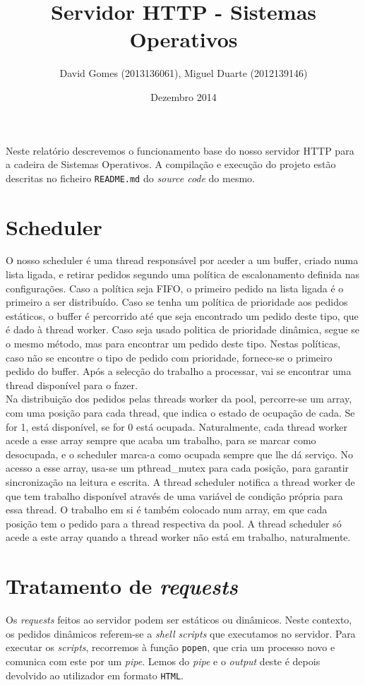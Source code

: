 \documentclass[12pt]{article}
\title{Servidor HTTP - Sistemas Operativos}
\author{David Gomes (2013136061), Miguel Duarte (2012139146)}
\date{Dezembro 2014}
\begin{document}
\maketitle

Neste relatório descrevemos o funcionamento base do nosso servidor HTTP
para a cadeira de Sistemas Operativos. A compilação e execução do projeto
estão descritas no ficheiro \texttt{README.md} do \textit{source code} do
mesmo.

\section{Scheduler}
O nosso scheduler é uma thread responsável por aceder a um buffer, criado numa lista ligada, e retirar pedidos segundo uma política de escalonamento definida nas configurações. Caso a política seja FIFO, o primeiro pedido na lista ligada é o primeiro a ser distribuído. Caso se tenha um política de prioridade aos pedidos estáticos, o buffer é percorrido até que seja encontrado um pedido deste tipo, que é dado à thread worker. Caso seja usado politica de prioridade dinâmica, segue se o mesmo método, mas para encontrar um pedido deste tipo. Nestas políticas, caso não se encontre o tipo de pedido com prioridade, fornece-se o primeiro pedido do buffer. Após a selecção do trabalho a processar, vai se encontrar uma thread disponível para o fazer.\\
Na distribuição dos pedidos pelas threads worker da pool, percorre-se um array, com uma posição para cada thread, que indica o estado de ocupação de cada. Se for 1, está disponível, se for 0 está ocupada. Naturalmente, cada thread worker acede a esse array sempre que acaba um trabalho, para se marcar como desocupada, e o scheduler marca-a como ocupada sempre que lhe dá serviço. No acesso a esse array, usa-se um pthread\_mutex para cada posição, para garantir sincronização na leitura e escrita. A thread scheduler notifica a thread worker de que tem trabalho disponível através de uma variável de condição própria para essa thread. O trabalho em si é também colocado num array, em que cada posição tem o pedido para a thread respectiva da pool. A thread scheduler só acede a este array quando a thread worker não está em trabalho, naturalmente.\\

\section{Tratamento de \textit{requests}}
Os \textit{requests} feitos ao servidor podem ser estáticos ou dinâmicos. Neste
contexto, os pedidos dinâmicos referem-se a \textit{shell scripts} que executamos
no servidor. Para executar os \textit{scripts}, recorremos à função
\texttt{popen}, que cria um processo novo e comunica com este por um \textit{pipe}.
Lemos do \textit{pipe} e o \textit{output} deste é depois devolvido ao utilizador
em formato \texttt{HTML}.
\end{document}

